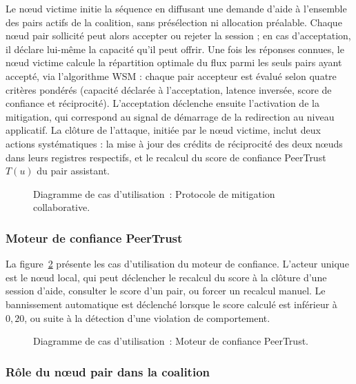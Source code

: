 Le nœud victime initie la séquence en diffusant une demande d'aide à l'ensemble
des pairs actifs de la coalition, sans présélection ni allocation préalable.
Chaque nœud pair sollicité peut alors accepter ou rejeter la session ; en cas
d'acceptation, il déclare lui-même la capacité qu'il peut offrir. Une fois les
réponses connues, le nœud victime calcule la répartition optimale du flux parmi
les seuls pairs ayant accepté, via l'algorithme WSM : chaque pair accepteur est
évalué selon quatre critères pondérés (capacité déclarée à l'acceptation, latence
inversée, score de confiance et réciprocité). L'acceptation déclenche ensuite
l'activation de la mitigation, qui correspond au signal de démarrage de la
redirection au niveau applicatif. La clôture de l'attaque, initiée par le nœud
victime, inclut deux actions systématiques : la mise à jour des crédits de
réciprocité des deux nœuds dans leurs registres respectifs, et le recalcul du
score de confiance PeerTrust $T(u)$ du pair assistant.

\begin{figure}[H]
\centering
{}

\caption{Diagramme de cas d'utilisation~: Protocole de mitigation collaborative.}
\label{fig:uc_mitigation}
\end{figure}

\subsubsection{Moteur de confiance PeerTrust}
La figure~\ref{fig:uc_trust} présente les cas d'utilisation du moteur
de confiance. L'acteur unique est le nœud local, qui peut
déclencher le recalcul du score à la clôture d'une session d'aide,
consulter le score d'un pair, ou forcer un recalcul manuel. Le
bannissement automatique est déclenché lorsque le score calculé
est inférieur à $0{,}20$, ou suite à la détection d'une violation
de comportement.


\begin{figure}[H]
\centering
{}
\caption{Diagramme de cas d'utilisation~: Moteur de confiance PeerTrust.}
\label{fig:uc_trust}
\end{figure}

\subsubsection{Rôle du nœud pair dans la coalition}

